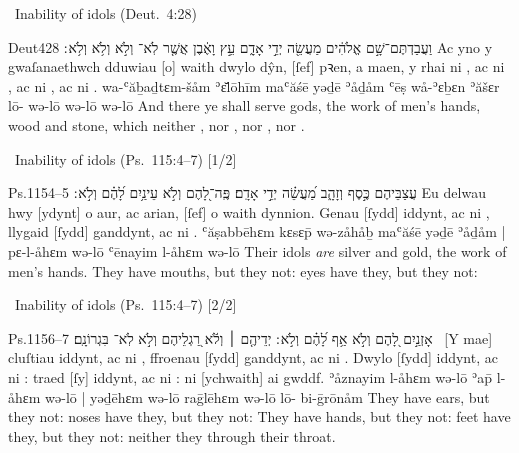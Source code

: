 \begin{frame}{\ex\ Inability of idols \hfill (Deut.~4:28)}
	\begin{example}{Deut}{4}{28}{}{}
		\quoling
		{וַעֲבַדְתֶּם־שָׁ֣ם אֱלֹהִ֔ים מַעֲשֵׂ֖ה יְדֵ֣י אָדָ֑ם עֵ֣ץ וָאֶ֔בֶן אֲשֶׁ֤ר לֹֽא־ וְלֹ֣א  וְלֹ֥א  וְלֹ֥א ׃}
		{Ac yno y gwaſanaethwch dduwiau [o] waith dwylo dŷn, [ſef] pꝛen, a maen, y rhai ni , ac ni , ac ni , ac ni .}
		{wa-ʿăḇaḏtɛm-šåm ʾɛ̆lōhīm maʿăśē yəḏē ʾåḏåm ʿēṣ wå-ʾɛḇɛn ʾăšɛr lō- wə-lō  wə-lō  wə-lō }
		{And there ye shall serve gods, the work of men’s hands, wood and stone, which neither , nor , nor , nor .}
	\end{example}
\end{frame}



\begin{frame}{\ex\ Inability of idols \hfill (Ps.~115:4–7) [1/2]}
	\begin{example}{Ps.}{115}{4–5}{}{}
		\quoling
		{%
			עֲצַבֵּיהֶם כֶּ֣סֶף וְזָהָ֑ב מַ֝עֲשֵׂ֗ה יְדֵ֣י אָדָֽם׃
			פֶּֽה־לָ֭הֶם וְלֹ֣א  עֵינַ֥יִם לָ֝הֶ֗ם וְלֹ֣א ׃
		}
		{%
			Eu delwau hwy [ydynt] o aur, ac arian, [ſef] o waith dynnion.
			Genau [ſydd] iddynt, ac ni , llygaid [ſydd] ganddynt, ac ni .
		}
		{%
			ʿăṣabbēhɛm kɛsɛp̄ wə-zåhåḇ maʿăśē yəḏē ʾåḏåm |
			pɛ-l-åhɛm wə-lō  ʿēnayim l-åhɛm wə-lō 
		}
		{%
			Their idols \textit{are} silver and gold, the work of men’s hands.
			They have mouths, but they  not: eyes have they, but they  not:
		}
	\end{example}
\end{frame}



\begin{frame}{\excont\ Inability of idols \hfill (Ps.~115:4–7) [2/2]}
	\begin{example}{Ps.}{115}{6–7}{}{}
		\quoling
		{%
			אָזְנַ֣יִם לָ֭הֶם וְלֹ֣א  אַ֥ף לָ֝הֶ֗ם וְלֹ֣א ׃
			יְדֵיהֶ֤ם ׀ וְלֹ֬א  רַ֭גְלֵיהֶם וְלֹ֣א  לֹֽא־ בִּגְרוֹנָֽם׃
		}
		{%
			~[Y mae] cluſtiau iddynt, ac ni , ffroenau [ſydd] ganddynt, ac ni .
			Dwylo [ſydd] iddynt, ac ni : traed [ſy] iddynt, ac ni : ni  [ychwaith] ai gwddf.
		}
		{%
			ʾåznayim l-åhɛm wə-lō  ʾap̄ l-åhɛm wə-lō  |
			yəḏēhɛm wə-lō  raḡlēhɛm wə-lō  lō- bi-ḡrōnåm
		}
		{%
			They have ears, but they  not: noses have they, but they  not:
			They have hands, but they  not: feet have they, but they  not: neither  they through their throat.
		}
	\end{example}
\end{frame}



